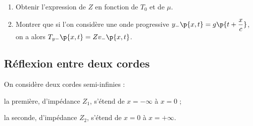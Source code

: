\documentclass[a4paper,french,bookmarks]{article}
\begin{document}
    \begin{enumerate}[resume]
        \item Obtenir l'expression de $Z$ en fonction de $T_0$ et de $\mu$.
        
        
        \item Montrer que si l'on considère une onde progressive $y_-\p{x, t} = g\p{t + \dfrac{x}{c}}$, on a alors $T_{y-}\p{x, t} = Z{v_-}\p{x, t}$.
        
        \noafter
        \nobefore\yesafter
        \yesbefore
    \end{enumerate}
    
    \subsection{Réflexion entre deux cordes}
    
    On considère deux cordes semi-infinies :
    \begin{enumerate}
        \itt la première, d'impédance $Z_1$, s'étend de $x = -\infty$ à $x = 0$ ;
        
        \itt la seconde, d'impédance $Z_2$, s'étend de $x = 0$ à $x = +\infty$.
    \end{enumerate}
    
\end{document}
